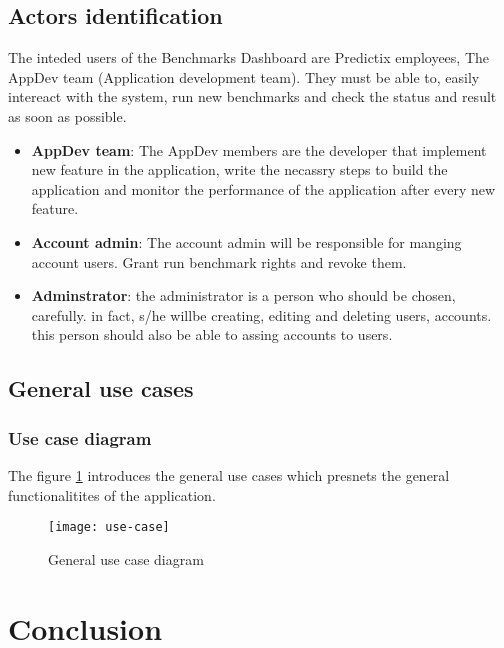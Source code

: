 \subsection{Actors identification}
The inteded users of the Benchmarks Dashboard are Predictix employees, The
AppDev team (Application development team). They must be able to, easily
intereact with the system, run new benchmarks and check the status and result as
soon as possible.

\begin{itemize}
  \item{\textbf{AppDev team}}: The AppDev members are the developer that implement new
    feature in the application, write the necassry steps to build the
    application and monitor the performance of the application after every new
    feature.
  \item{\textbf{Account admin}}: The account admin will be responsible for manging
    account users. Grant run benchmark rights and revoke them.
  \item{\textbf{Adminstrator}}: the administrator is a person who should be chosen,
    carefully. in fact, s/he willbe creating, editing and deleting users,
    accounts. this person should also be able to assing accounts to users.
\end{itemize}

\subsection{General use cases}
\subsubsection{Use case diagram}
The figure \hyperref[fig:use-case]{\ref{fig:use-case}} introduces the general use cases which presnets the general
functionalitites of the application.

\begin{figure}[h]
  \center
  \texttt{[image: use-case]}
  \caption{General use case diagram}
\label{fig:use-case}
\end{figure}


\section*{Conclusion}

